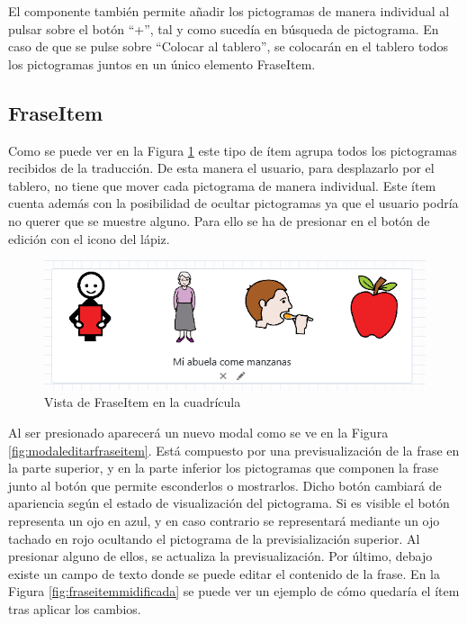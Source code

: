 El componente también permite añadir los pictogramas de manera individual al pulsar sobre el botón “+”, tal y como sucedía en búsqueda de pictograma. En caso de que se pulse sobre “Colocar al tablero”, se colocarán en el tablero todos los pictogramas juntos en un único elemento FraseItem. 

\subsection{FraseItem}

Como se puede ver en la Figura \ref{fig:fraseitemoriginal} este tipo de  ítem agrupa todos los pictogramas recibidos de la traducción. De esta manera el usuario, para desplazarlo por el tablero, no tiene que mover cada pictograma de manera individual. Este ítem cuenta además con la posibilidad de ocultar pictogramas ya que el usuario podría no querer que se muestre alguno. Para ello se ha de presionar en el botón de edición con el icono del lápiz. 

\begin{figure}[h!]
	\centering
	\includegraphics[width=0.7\linewidth]{Imagenes/Bitmap/fraseItemOriginal}
	\caption{Vista de FraseItem en la cuadrícula}
	\label{fig:fraseitemoriginal}
\end{figure}


Al ser presionado aparecerá un nuevo modal como se ve en la Figura \ref{fig:modaleditarfraseitem}. Está compuesto por una previsualización de la frase en la parte superior, y en la parte inferior los pictogramas que componen la frase junto al botón que permite esconderlos o mostrarlos. Dicho botón cambiará de apariencia según el estado de visualización del pictograma. Si es visible el botón representa un ojo en azul, y en caso contrario se representará mediante un ojo tachado en rojo ocultando el pictograma de la previsialización superior. Al presionar alguno de ellos, se actualiza la previsualización. Por último, debajo existe un campo de texto donde se puede editar el contenido de la frase.
En la Figura \ref{fig:fraseitemmidificada} se puede ver un ejemplo de cómo quedaría el ítem tras aplicar los cambios. 

